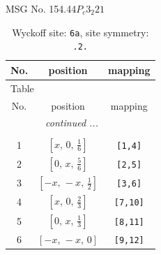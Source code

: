 \documentclass[fleqn,8pt]{jsarticle}
\begin{document}
\setcounter{MaxMatrixCols}{32}

\renewcommand{\tablename}{Table~}
\renewcommand{\figurename}{Figure~}
\begin{center}
\LARGE
MSG No. 154.44\quad$P_{c}3_{2}21$
\end{center}
\renewcommand{\arraystretch}{1.2}
\begin{longtable}{ccc}
\caption{Wyckoff site: {\tt 6a}, site symmetry: {\tt .2.}}
 \\
 \hline \hline
No. & position & mapping \\ \hline \endfirsthead

\multicolumn{2}{l}{\tablename\ \thetable{}} \\
 \hline \hline
No. & position & mapping \\ \hline \endhead

 \hline \hline
\multicolumn{2}{r}{\footnotesize\it continued ...} \\ \endfoot

 \hline \hline
\multicolumn{2}{r}{} \\ \endlastfoot

1 & $\left[ x,\, 0,\, \frac{1}{6} \right]$ & {\tt [1,4]} \\ \hline
2 & $\left[ 0,\, x,\, \frac{5}{6} \right]$ & {\tt [2,5]} \\ \hline
3 & $\left[ - x,\, - x,\, \frac{1}{2} \right]$ & {\tt [3,6]} \\ \hline
4 & $\left[ x,\, 0,\, \frac{2}{3} \right]$ & {\tt [7,10]} \\ \hline
5 & $\left[ 0,\, x,\, \frac{1}{3} \right]$ & {\tt [8,11]} \\ \hline
6 & $\left[ - x,\, - x,\, 0 \right]$ & {\tt [9,12]} \\
\end{longtable}
\renewcommand{\arraystretch}{1.2}
\end{document}
